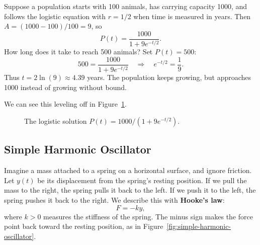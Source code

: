 \begin{exampleblock}[breakable]
Suppose a population starts with 100 animals, has carrying capacity
1000, and follows the logistic equation with $r=1/2$ when time is measured
in years. Then $A=(1000-100)/100=9$, so
$$P(t)=\frac{1000}{1+9e^{-t/2}}.$$
How long does it take to reach 500 animals? Set $P(t)=500$:
$$500=\frac{1000}{1+9e^{-t/2}}
\quad\Longrightarrow\quad e^{-t/2}=\frac19.$$
Thus $t=2\ln(9)\approx4.39$ years. The population keeps growing, but
approaches 1000 instead of growing without bound.

We can see this leveling off in Figure~\ref{fig:logistic-population}.
\begin{figure}[H]
\centering
{}
\caption{The logistic solution $P(t)=1000/(1+9e^{-t/2})$.}
\label{fig:logistic-population}
\end{figure}
\end{exampleblock}

\subsection{Simple Harmonic Oscillator}

Imagine a mass attached to a spring on a horizontal surface, and ignore
friction. Let $y(t)$ be its displacement from the spring's resting
position. If we pull the mass to the right, the spring pulls it back to
the left. If we push it to the left, the spring pushes it back to the
right. We describe this with \textbf{Hooke's law}:
$$F=-ky,$$
where $k>0$ measures the stiffness of the spring. The minus sign makes
the force point back toward the resting position, as in
Figure~\ref{fig:simple-harmonic-oscillator}.

